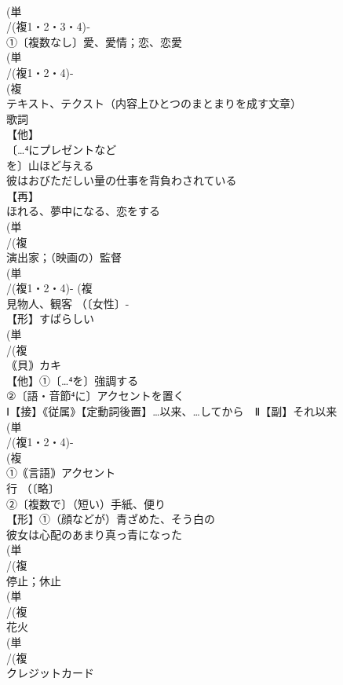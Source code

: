 \documentclass[8pt]{extreport}
\begin{document}
\begin{CJK}{UTF8}{min}
\\	(単
\\	/(複1・2・3・4)‐
\\	①〔複数なし〕愛、愛情；恋、恋愛 
\\	(単
\\	/(複1・2・4)-
\\	(複
\\	テキスト、テクスト（内容上ひとつのまとまりを成す文章）
\\	歌詞
\\	【他】
\\	〔…⁴にプレゼントなど
\\	を〕山ほど与える 
\\	彼はおびただしい量の仕事を背負わされている
\\	【再】
\\	ほれる、夢中になる、恋をする
\\	(単
\\	/(複
\\	演出家；（映画の）監督 
\\	(単
\\	/(複1・2・4)- (複
\\	見物人、観客 （〔女性〕-
\\	【形】すばらしい 
\\	(単
\\	/(複
\\	｟貝｠カキ 
\\	【他】①〔…⁴を〕強調する 
\\	②〔語・音節⁴に〕アクセントを置く
\\	Ⅰ【接】《従属》【定動詞後置】…以来、…してから　Ⅱ【副】それ以来
\\	(単
\\	/(複1・2・4)-
\\	(複
\\	①｟言語｠アクセント 
\\	行 （〔略〕
\\	②〔複数で〕（短い）手紙、便り
\\	【形】①（顔などが）青ざめた、そう白の 
\\	彼女は心配のあまり真っ青になった
\\	(単
\\	/(複
\\	停止；休止 
\\	(単
\\	/(複
\\	花火 
\\	(単
\\	/(複
\\	クレジットカード 

\end{CJK}
\end{document}
